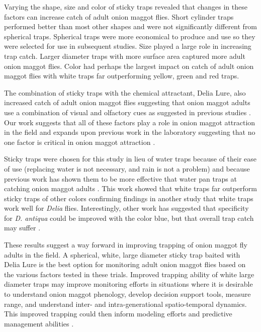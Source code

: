 \documentclass[alpha-refs]{wiley-article}
\begin{document}
Varying the shape, size and color of sticky traps revealed that changes in these factors can increase catch of adult onion maggot flies.  Short cylinder traps performed better than most other shapes and were not significantly different from spherical traps.  Spherical traps were more economical to produce and use so they were selected for use in subsequent studies.  Size played a large role in increasing trap catch.  Larger diameter traps with more surface area captured more adult onion maggot flies.  Color had perhaps the largest impact on catch of adult onion maggot flies with white traps far outperforming yellow, green and red traps.  

The combination of sticky traps with the chemical attractant, Delia Lure, also increased catch of adult onion maggot flies suggesting that onion maggot adults use a combination of visual and olfactory cues as suggested in previous studies \citep{harris1983color, harris1988host}.  Our work suggests that all of these factors play a role in onion maggot attraction in the field and expands upon previous work in the laboratory suggesting that no one factor is critical in onion maggot attraction \citep{harris1988host}.  

Sticky traps were chosen for this study in lieu of water traps because of their ease of use (replacing water is not necessary, and rain is not a problem) and because previous work has shown them to be more effective that water pan traps at catching onion maggot adults \citep{thomingdeveloping}.  This work showed that white traps far outperform sticky traps of other colors confirming findings in another study that white traps work well for \textit{Delia} flies.  Interestingly, other work has suggested that specificity for \textit{D. antiqua} could be improved with the color blue, but that overall trap catch may suffer \citep{thomingdeveloping}.   

These results suggest a way forward in improving trapping of onion maggot fly adults in the field. A spherical, white, large diameter sticky trap baited with Delia Lure is the best option for monitoring adult onion maggot flies based on the various factors tested in these trials. Improved trapping ability of white large diameter traps may improve monitoring efforts in situations where it is desirable to understand onion maggot phenology, develop decision support tools, measure range, and understand inter- and intra-generational spatio-temporal dynamics.  This improved trapping could then inform modeling efforts and predictive management abilities \citep{ning2017predicting, otto2000development,thomingdeveloping}.    
\end{document}
